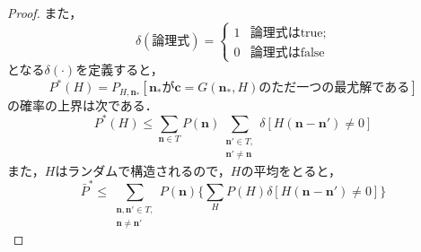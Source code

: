 \documentclass[a4paper,11pt]{jsarticle}
\numberwithin{theorem}{section}  %
\numberwithin{equation}{section} %
\begin{document}
\begin{proof}
また，
\[
\delta(\text{論理式})=\begin{cases}
1& \text{論理式はtrue};\\
0& \text{論理式はfalse}
\end{cases}
\]
となる$\delta(\cdot)$を定義すると，
\[
P^*(H) = P_{H,\bm{n}_*}[\bm{n}_*\text{が}\bm{c}=G(\bm{n}_*,H)\text{のただ一つの最尤解である}]
\]
の確率の上界は次である．
\[
P^*(H) \le \sum_{\bm{n}\in T} P(\bm{n}) \sum_{\substack{\bm{n}'\in T,\\ \bm{n}' \neq \bm{n}}} \delta[H(\bm{n} - \bm{n}') \neq 0]
\]
また，$H$はランダムで構造されるので，$H$の平均をとると，
\[
\bar{P}^* \le \sum_{\substack{\bm{n}, \bm{n}'\in T, \\\bm{n}\neq \bm{n}'}} P(\bm{n}) \Bigr\{ \sum_{H} P(H) \delta[H(\bm{n} - \bm{n}') \neq 0] \Bigr\}
\]
\[
\
\]

\end{proof}
\end{document}
